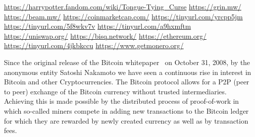 \urldef\urlharrypotter\url{https://harrypotter.fandom.com/wiki/Tongue-Tying_Curse}
\urldef\urlgrin\url{https://grin.mw/}
\urldef\urlbeam\url{https://beam.mw/}
\urldef{\urlcoinmkt}\url{https://coinmarketcap.com/}
\urldef{\urlmtgox}\url{https://tinyurl.com/yrcpp5jm}
\urldef{\urlbitgrail}\url{https://tinyurl.com/5f8wkv7v}
\urldef{\urlquadriga}\url{https://tinyurl.com/a9hxmftm}
\urldef{\urluniswp}\url{https://uniswap.org/}
\urldef{\urlbisq}\url{https://bisq.network/}
\urldef{\urlethereum}\url{https://ethereum.org/}
\urldef{\urlgrinfund}\url{https://tinyurl.com/4jkbkccu}
\urldef{\urlmonero}\url{https://www.getmonero.org/}

Since the original release of the Bitcoin whitepaper~\cite{nakamoto2019bitcoin} on October 31, 2008, by the anonymous entity Satoshi Nakamoto we have seen a continuous rise in interest in Bitcoin and other Cryptocurrencies.
The Bitcoin protocol allows for a P2P (peer to peer) exchange of the Bitcoin currency without trusted intermediaries.
Achieving this is made possible by the distributed process of proof-of-work in which so-called miners compete in adding new transactions to the Bitcoin ledger for which they are rewarded by newly created currency as well as by transaction fees.

